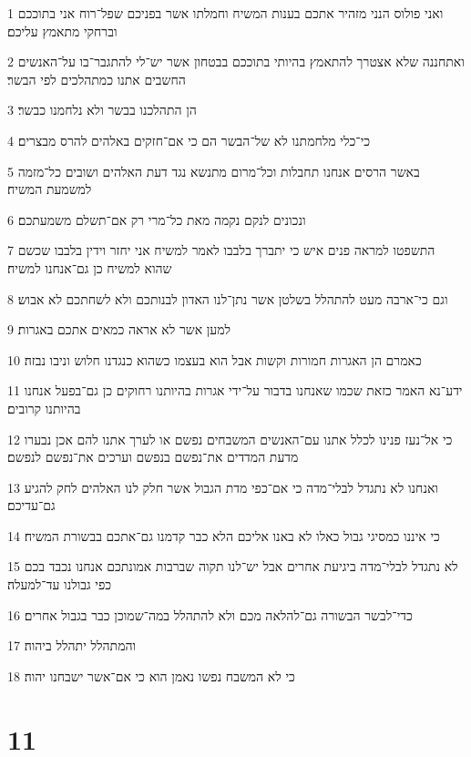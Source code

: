 \par 1 ואני פולוס הנני מזהיר אתכם בענות המשיח וחמלתו אשר בפניכם שפל־רוח אני בתוככם וברחקי מתאמץ עליכם׃
\par 2 ואתחננה שלא אצטרך להתאמץ בהיותי בתוככם בבטחון אשר יש־לי להתגבר־בו על־האנשים החשבים אתנו כמתהלכים לפי הבשר׃
\par 3 הן התהלכנו בבשר ולא נלחמנו כבשר׃
\par 4 כי־כלי מלחמתנו לא של־הבשר הם כי אם־חזקים באלהים להרס מבצרים׃
\par 5 באשר הרסים אנחנו תחבלות וכל־מרום מתנשא נגד דעת האלהים ושובים כל־מזמה למשמעת המשיח׃
\par 6 ונכונים לנקם נקמה מאת כל־מרי רק אם־תשלם משמעתכם׃
\par 7 התשפטו למראה פנים איש כי יתברך בלבבו לאמר למשיח אני יחזר וידין בלבבו שכשם שהוא למשיח כן גם־אנחנו למשיח׃
\par 8 וגם כי־ארבה מעט להתהלל בשלטן אשר נתן־לנו האדון לבנותכם ולא לשחתכם לא אבוש׃
\par 9 למען אשר לא אראה כמאים אתכם באגרות׃
\par 10 כאמרם הן האגרות חמורות וקשות אבל הוא בעצמו כשהוא כנגדנו חלוש וניבו נבזה׃
\par 11 ידע־נא האמר כזאת שכמו שאנחנו בדבור על־ידי אגרות בהיותנו רחוקים כן גם־בפעל אנחנו בהיותנו קרובים׃
\par 12 כי אל־נעז פנינו לכלל אתנו עם־האנשים המשבחים נפשם או לערך אתנו להם אכן נבערו מדעת המדדים את־נפשם בנפשם וערכים את־נפשם לנפשם׃
\par 13 ואנחנו לא נתגדל לבלי־מדה כי אם־כפי מדת הגבול אשר חלק לנו האלהים לחק להגיע גם־עדיכם׃
\par 14 כי איננו כמסיגי גבול כאלו לא באנו אליכם הלא כבר קדמנו גם־אתכם בבשורת המשיח׃
\par 15 לא נתגדל לבלי־מדה ביגיעת אחרים אבל יש־לנו תקוה שברבות אמונתכם אנחנו נכבד בכם כפי גבולנו עד־למעלה׃
\par 16 כדי־לבשר הבשורה גם־להלאה מכם ולא להתהלל במה־שמוכן כבר בגבול אחרים׃
\par 17 והמתהלל יתהלל ביהוה׃
\par 18 כי לא המשבח נפשו נאמן הוא כי אם־אשר ישבחנו יהוה׃

\chapter{11}


